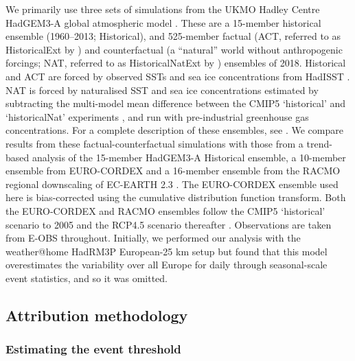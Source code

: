     We primarily use three sets of simulations from the UKMO Hadley Centre HadGEM3-A global atmospheric model \citep{christidis_new_2013,ciavarella_upgrade_2018}. These are a 15-member historical ensemble (1960--2013; Historical), and 525-member factual (ACT, referred to as HistoricalExt by \citeauthor{ciavarella_upgrade_2018}) and counterfactual (a “natural” world without anthropogenic forcings; NAT, referred to as HistoricalNatExt by \citeauthor{ciavarella_upgrade_2018}) ensembles of 2018. Historical and ACT are forced by observed SSTs and sea ice concentrations from HadISST \citep{rayner_global_2003}. NAT is forced by naturalised SST and sea ice concentrations estimated by subtracting the multi-model mean difference between the CMIP5 `historical' and `historicalNat' experiments \citep{taylor_overview_2012}, and run with pre-industrial greenhouse gas concentrations. For a complete description of these ensembles, see \citet{ciavarella_upgrade_2018}. We compare results from these factual-counterfactual simulations with those from a trend-based analysis of the 15-member HadGEM3-A Historical ensemble, a 10-member ensemble from EURO-CORDEX \citep[1971--2018;][]{vautard_simulation_2013,jacob_euro-cordex_2014,vrac_influence_2017} and a 16-member ensemble from the RACMO regional downscaling of EC-EARTH 2.3 \citep[1950--2018;][]{aalbers_local-scale_2018,lenderink_preparing_2014}. The EURO-CORDEX ensemble used here is bias-corrected using the cumulative distribution function transform. Both the EURO-CORDEX and RACMO ensembles follow the CMIP5 `historical' scenario to 2005 and the RCP4.5 scenario thereafter \citep{taylor_overview_2012,thomson_rcp45_2011}. Observations are taken from E-OBS \citep[1950--2018;][]{cornes_ensemble_2018} throughout. Initially, we performed our analysis with the weather@home HadRM3P European-25 km setup \citep{massey_weatherhome-development_2015} but found that this model overestimates the variability over all Europe for daily through seasonal-scale event statistics, and so it was omitted.

  \subsection*{Attribution methodology}

    \subsubsection*{Estimating the event threshold}

